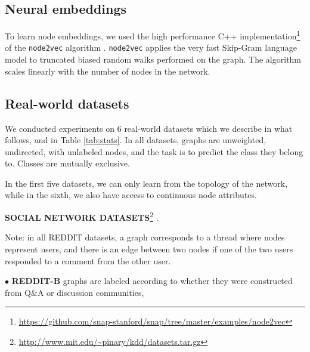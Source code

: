 \documentclass[sigconf]{acmart}
\begin{document}

\subsection{Neural embeddings}
To learn node embeddings, we used the high performance C++  implementation\footnote{\scriptsize{\url{https://github.com/snap-stanford/snap/tree/master/examples/node2vec}}} of the \texttt{node2vec} algorithm \citep{grover2016node2vec}. \texttt{node2vec} applies the very fast Skip-Gram language model \citep{mikolov2013efficient} to truncated biased random walks performed on the graph. The algorithm scales linearly with the number of nodes in the network.

\subsection{Real-world datasets}
We conducted experiments on 6 real-world datasets which we describe in what follows, and in Table \ref{tab:stats}. In all datasets, graphs are unweighted, undirected, with unlabeled nodes, and the task is to predict the class they belong to. Classes are mutually exclusive. 

In the first five datasets, we can only learn from the topology of the network, while in the sixth, we also have access to continuous node attributes.

\textbf{SOCIAL NETWORK DATASETS}\footnote{\scriptsize{\url{http://www.mit.edu/~pinary/kdd/datasets.tar.gz}}} \citep{yanardag2015deep}.

\noindent Note: in all REDDIT datasets, a graph corresponds to a thread where nodes represent users, and there is an edge between two nodes if one of the two users responded to a comment from the other user.

\noindent$\bullet$ \textbf{REDDIT-B} graphs are labeled according to whether they were constructed from Q\&A or discussion communities,
\end{document}
